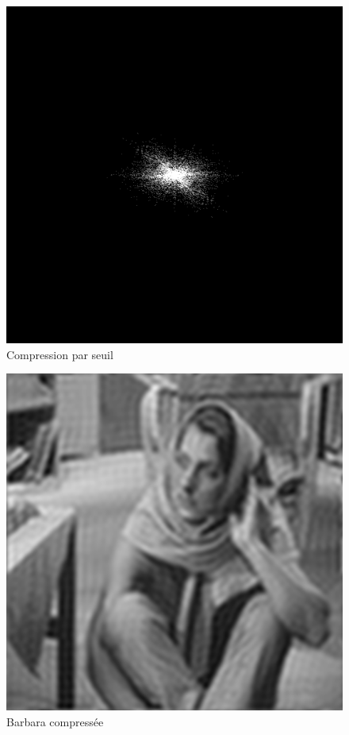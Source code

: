 \documentclass{article}
\begin{document}
\begin{figure}
	\begin{center}
		\includegraphics[scale=0.4]{lena_compresse_seuil}\\
		Compression par seuil
	\end{center}
\end{figure}
\begin{figure}
	\begin{center}
		\includegraphics[scale=0.4]{barbara_compresse}\\
		Barbara compressée
	\end{center}
\end{figure}
\end{document}
